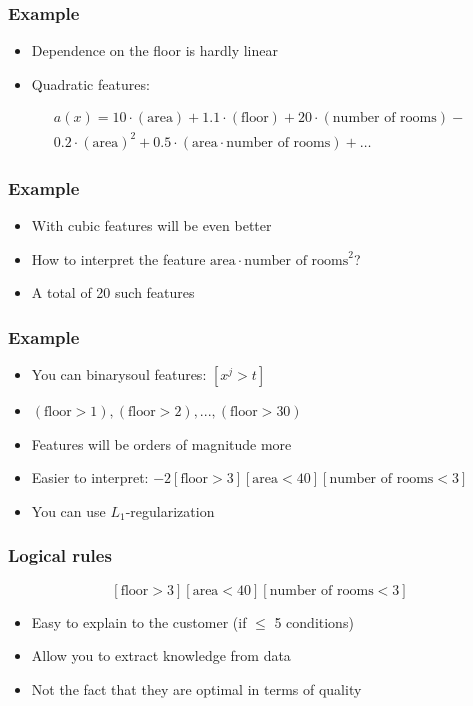 \documentclass[default]{beamer}
\begin{document}
	\begin{frame}
		\frametitle{Example}
		
		\Large	
		\begin{itemize}
			\item Dependence on the floor is hardly linear
			\item Quadratic features:
		\end{itemize}
		
		
		\begin{multline*}
		a(x)=10\cdot (\text{area}) + 1.1\cdot (\text{floor}) + 20\cdot (\text{number of rooms}) -\\
			0.2\cdot(\text{area})^2 + 0.5\cdot (\text{area}\cdot\text{number of rooms})+\dots
		\end{multline*}
			
		
	\end{frame}

	\begin{frame}
		\frametitle{Example}
		\Large	
		\begin{itemize}
			\item With cubic features will be even better
			\item How to interpret the feature  $\text{area}\cdot\text{number of rooms}^2$?
			\item A total of 20 such features
		\end{itemize}
		
	\end{frame}

	\begin{frame}
		\frametitle{Example}
		\Large	
		\begin{itemize}
			\item You can binarysoul features: $[x^j>t]$
			\item $(\text{floor} > 1), (\text{floor} > 2),...,(\text{floor} > 30)$
			\item Features will be orders of magnitude more
			\item Easier to interpret:
			$-2 [\text{floor} > 3][\text{area} < 40][\text{number of rooms} < 3]$
			
			\item You can use $L_1$-regularization
		\end{itemize}
		
	\end{frame}

	\begin{frame}
		\frametitle{Logical rules}
		
		\Large
		\[
		[\text{floor} > 3][\text{area} < 40][\text{number of rooms} < 3]
		\]
		
		\begin{itemize}
			\item Easy to explain to the customer (if $\le$ 5 conditions)
			\item Allow you to extract knowledge from data
			\item Not the fact that they are optimal in terms of quality
		\end{itemize}
	\end{frame}
\end{document}
